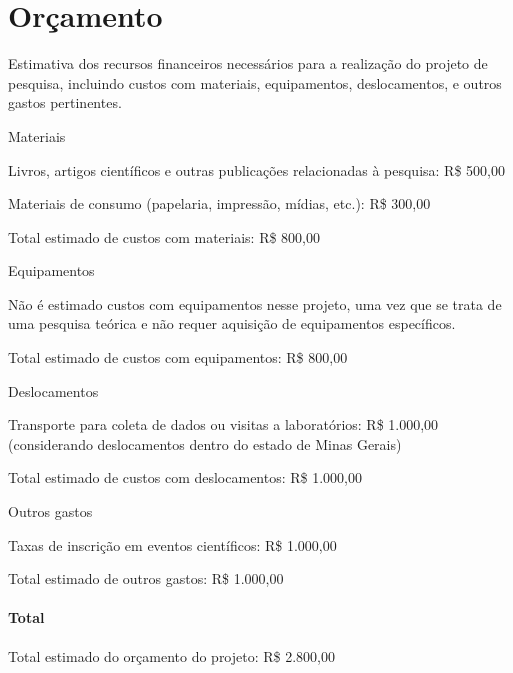 \section{Orçamento}

Estimativa dos recursos financeiros necessários para a realização do projeto de pesquisa, incluindo custos com materiais, equipamentos, deslocamentos, e outros gastos pertinentes.
  
\begin{inparaenum}
    \item Materiais
    \begin{inparaenum}
        \item Livros, artigos científicos e outras publicações relacionadas à pesquisa: R\$ 500,00
        \item Materiais de consumo (papelaria, impressão, mídias, etc.): R\$ 300,00
        \item Total estimado de custos com materiais: R\$ 800,00
    \end{inparaenum}
        
    \item Equipamentos 
    \begin{inparaenum}
        \item Não é estimado custos com equipamentos nesse projeto, uma vez que se trata de uma pesquisa teórica e não requer aquisição de equipamentos específicos.
        \item Total estimado de custos com equipamentos: R\$ 800,00
    \end{inparaenum}
    
    \item Deslocamentos
    \begin{inparaenum}
        \item Transporte para coleta de dados ou visitas a laboratórios: R\$ 1.000,00 (considerando deslocamentos dentro do estado de Minas Gerais)
        \item Total estimado de custos com deslocamentos: R\$ 1.000,00
    \end{inparaenum}
    
    \item Outros gastos
    \begin{inparaenum}
        \item Taxas de inscrição em eventos científicos: R\$ 1.000,00
        \item Total estimado de outros gastos: R\$ 1.000,00
    \end{inparaenum}
\end{inparaenum}
 
\paragraph{Total}
Total estimado do orçamento do projeto: R\$ 2.800,00
